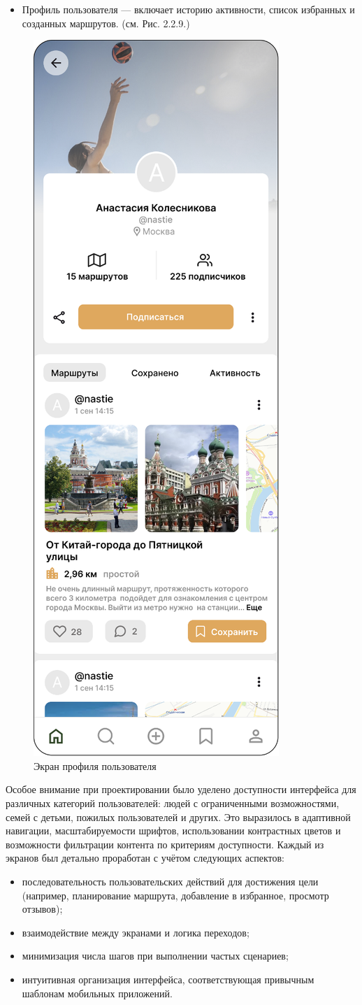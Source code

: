 \begin{itemize}
    \item Профиль пользователя — включает историю активности, список избранных и созданных маршрутов. (см. Рис. 2.2.9.)
\end{itemize}
\begin{figure}[H]
        \centering
        \includegraphics[width=0.4\linewidth]{Images/ui/Picture9.png}
        \caption{Экран профиля пользователя}
        \label{fig:ui_screen_9}
\end{figure}
Особое внимание при проектировании было уделено доступности интерфейса для различных категорий пользователей: людей с ограниченными возможностями, семей с детьми, пожилых пользователей и других. Это выразилось в адаптивной навигации, масштабируемости шрифтов, использовании контрастных цветов и возможности фильтрации контента по критериям доступности.
Каждый из экранов был детально проработан с учётом следующих аспектов:
\begin{itemize}
    \item последовательность пользовательских действий для достижения цели (например, планирование маршрута, добавление в избранное, просмотр отзывов);
    \item взаимодействие между экранами и логика переходов;
    \item минимизация числа шагов при выполнении частых сценариев;
    \item интуитивная организация интерфейса, соответствующая привычным шаблонам мобильных приложений.
\end{itemize}

